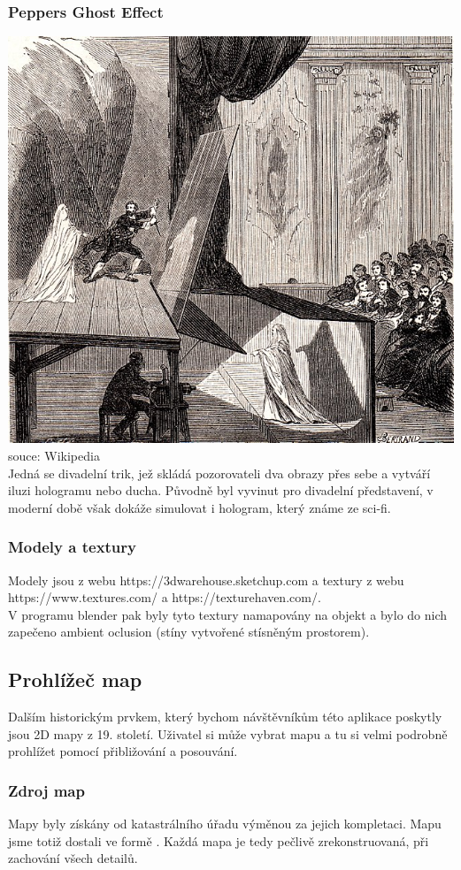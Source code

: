 \subsubsection{Peppers Ghost Effect}
\includegraphics[width=.5\textwidth]{img/Peppers_Ghost.jpg}souce: Wikipedia\\
Jedná se divadelní trik, jež skládá pozorovateli dva obrazy přes sebe a vytváří iluzi
hologramu nebo ducha. Původně byl vyvinut pro divadelní představení, v moderní
době však dokáže simulovat i hologram, který známe ze sci-fi.

\subsubsection{Modely a textury}
Modely jsou z webu https://3dwarehouse.sketchup.com a
textury z webu https://www.textures.com/ a https://texturehaven.com/.\\
V programu blender pak byly tyto textury namapovány na objekt a bylo do nich
zapečeno ambient oclusion (stíny vytvořené stísněným prostorem).



\subsection{Prohlížeč map}
Dalším historickým prvkem, který bychom návštěvníkům této aplikace poskytly jsou
2D mapy z 19. století. Uživatel si může vybrat mapu a tu si velmi podrobně
prohlížet pomocí přibližování a posouvání.

\subsubsection{Zdroj map}
Mapy byly získány od katastrálního úřadu výměnou za jejich kompletaci.
Mapu jsme totiž dostali ve formě .
Každá mapa je tedy pečlivě zrekonstruovaná, při zachování všech detailů.
